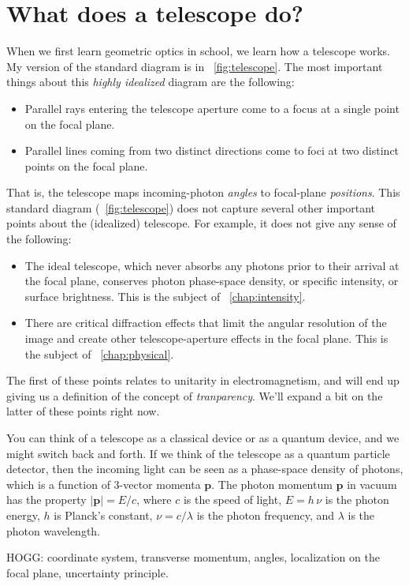 \documentclass{book}
\newcommand{\chapref}[1]{\chaptername~\ref{#1}}
\newcommand{\figref}[1]{\figurename~\ref{#1}}
\newcommand{\tv}[1]{\bm{#1}} %
\begin{document}
\chapter{What does a telescope do?}
When we first learn geometric optics in school, we learn how a telescope works.
My version of the standard diagram is in \figref{fig:telescope}.
The most important things about this \emph{highly idealized} diagram are the following:
\begin{itemize}
    \item Parallel rays entering the telescope aperture come to a focus at a single point on the focal plane.
    \item Parallel lines coming from two distinct directions come to foci at two distinct points on the focal plane.
\end{itemize}
That is, the telescope maps incoming-photon \emph{angles} to focal-plane \emph{positions}.
This standard diagram (\figref{fig:telescope}) does not capture several other important points about the (idealized) telescope.
For example, it does not give any sense of the following:
\begin{itemize}
    \item The ideal telescope, which never absorbs any photons prior to their arrival at the focal plane, conserves photon phase-space density, or specific intensity, or surface brightness. This is the subject of \chapref{chap:intensity}.
    \item There are critical diffraction effects that limit the angular resolution of the image and create other telescope-aperture effects in the focal plane. This is the subject of \chapref{chap:physical}.
\end{itemize}
The first of these points relates to unitarity in electromagnetism, and will end up giving us a definition of the concept of \emph{tranparency}.
We'll expand a bit on the latter of these points right now.

You can think of a telescope as a classical device or as a quantum device, and we might switch back and forth.
If we think of the telescope as a quantum particle detector, then the incoming light can be seen as a phase-space density of photons, which is a function of 3-vector momenta $\tv{p}$.
The photon momentum $\tv{p}$ in vacuum has the property $|\tv{p}|=E/c$, where $c$ is the speed of light, $E=h\,\nu$ is the photon energy, $h$ is Planck's constant, $\nu=c/\lambda$ is the photon frequency, and $\lambda$ is the photon wavelength.

HOGG: coordinate system, transverse momentum, angles, localization on the focal plane, uncertainty principle.
\end{document}
